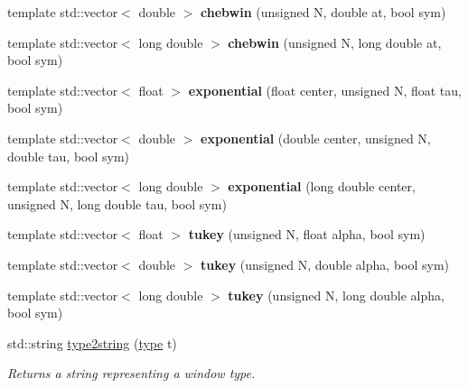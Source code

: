\begin{DoxyCompactItemize}
\item 
\mbox{\label{namespacedsp_1_1window_ae4cd6bc679dea0a42c1df63a93062b50}} 
template std\+::vector$<$ double $>$ {\bfseries chebwin} (unsigned N, double at, bool sym)
\item 
\mbox{\label{namespacedsp_1_1window_a72e4d619056ed5b41420aca5f7edc770}} 
template std\+::vector$<$ long double $>$ {\bfseries chebwin} (unsigned N, long double at, bool sym)
\item 
\mbox{\label{namespacedsp_1_1window_aae4d3c5e5d4061c0aac640c08ada3def}} 
template std\+::vector$<$ float $>$ {\bfseries exponential} (float center, unsigned N, float tau, bool sym)
\item 
\mbox{\label{namespacedsp_1_1window_a5447313915ccb016d1fa36a52cc49bd0}} 
template std\+::vector$<$ double $>$ {\bfseries exponential} (double center, unsigned N, double tau, bool sym)
\item 
\mbox{\label{namespacedsp_1_1window_adeaf78f97a81abef1f11deee4e3e3b60}} 
template std\+::vector$<$ long double $>$ {\bfseries exponential} (long double center, unsigned N, long double tau, bool sym)
\item 
\mbox{\label{namespacedsp_1_1window_a243e22ebfc37ee1537d7bb3f580d58e3}} 
template std\+::vector$<$ float $>$ {\bfseries tukey} (unsigned N, float alpha, bool sym)
\item 
\mbox{\label{namespacedsp_1_1window_a5293c7955a8331d71fbc703b9752a7e9}} 
template std\+::vector$<$ double $>$ {\bfseries tukey} (unsigned N, double alpha, bool sym)
\item 
\mbox{\label{namespacedsp_1_1window_a56151dd900e40f4c28bb585074d5e7f2}} 
template std\+::vector$<$ long double $>$ {\bfseries tukey} (unsigned N, long double alpha, bool sym)
\item 
std\+::string \mbox{\hyperlink{namespacedsp_1_1window_a8570ba336a7b9c53c308f80610e5fcbd}{type2string}} (\mbox{\hyperlink{namespacedsp_1_1window_a1cc0dcec4aa9e12640771bdf41f695b8}{type}} t)
\begin{DoxyCompactList}\small\item\em Returns a string representing a window type. \end{DoxyCompactList}\item 

\end{DoxyCompactItemize}
